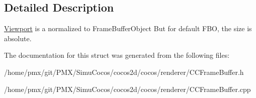 \subsection{Detailed Description}
\hyperlink{structexperimental_1_1Viewport}{Viewport} is a normalized to Frame\+Buffer\+Object But for default F\+BO, the size is absolute. 

The documentation for this struct was generated from the following files\+:\begin{DoxyCompactItemize}
\item 
/home/pmx/git/\+P\+M\+X/\+Simu\+Cocos/cocos2d/cocos/renderer/C\+C\+Frame\+Buffer.\+h\item 
/home/pmx/git/\+P\+M\+X/\+Simu\+Cocos/cocos2d/cocos/renderer/C\+C\+Frame\+Buffer.\+cpp\end{DoxyCompactItemize}
